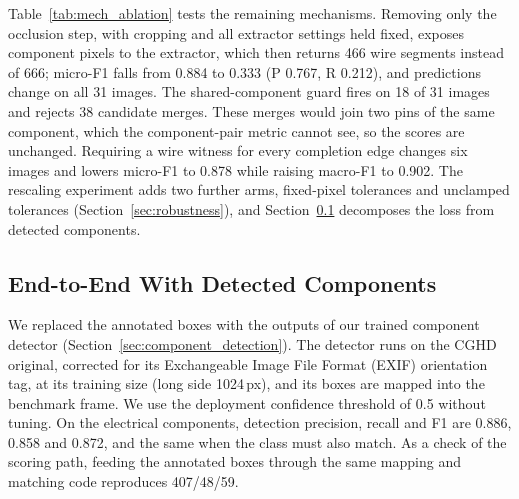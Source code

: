 \documentclass{ieeeaccess}
\begin{document}
Table~\ref{tab:mech_ablation} tests the remaining mechanisms. Removing only the occlusion step, with cropping and all extractor settings held fixed, exposes component pixels to the extractor, which then returns 466 wire segments instead of 666; micro-F1 falls from 0.884 to 0.333 (P 0.767, R 0.212), and predictions change on all 31 images. The shared-component guard fires on 18 of 31 images and rejects 38 candidate merges. These merges would join two pins of the same component, which the component-pair metric cannot see, so the scores are unchanged. Requiring a wire witness for every completion edge changes six images and lowers micro-F1 to 0.878 while raising macro-F1 to 0.902. The rescaling experiment adds two further arms, fixed-pixel tolerances and unclamped tolerances (Section~\ref{sec:robustness}), and Section~\ref{sec:e2e} decomposes the loss from detected components.

\subsection{End-to-End With Detected Components}
\label{sec:e2e}

We replaced the annotated boxes with the outputs of our trained component detector (Section~\ref{sec:component_detection}). The detector runs on the CGHD original, corrected for its Exchangeable Image File Format (EXIF) orientation tag, at its training size (long side 1024\,px), and its boxes are mapped into the benchmark frame. We use the deployment confidence threshold of 0.5 without tuning. On the electrical components, detection precision, recall and F1 are 0.886, 0.858 and 0.872, and the same when the class must also match. As a check of the scoring path, feeding the annotated boxes through the same mapping and matching code reproduces 407/48/59.
\end{document}
